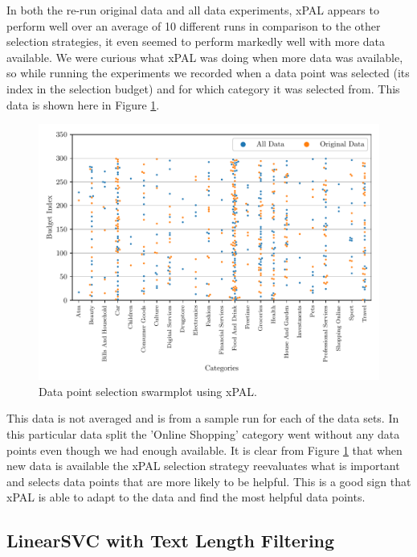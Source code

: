 In both the re-run original data and all data experiments, xPAL appears to perform well over an average of 10 different runs in comparison to the other selection strategies, it even seemed to perform markedly well with more data available. We were curious what xPAL was doing when more data was available, so while running the experiments we recorded when a data point was selected (its index in the selection budget) and for which category it was selected from. This data is shown here in Figure \ref{fig:xpal_data_selection}.

\begin{figure}[h]
  \centering
  \includegraphics[width=\textwidth]{../img/plot_xpal_selection_dist.pdf}
  \caption{Data point selection swarmplot using xPAL.}
  \label{fig:xpal_data_selection}
\end{figure}

This data is not averaged and is from a sample run for each of the data sets. In this particular data split the 'Online Shopping' category went without any data points even though we had enough available. It is clear from Figure \ref{fig:xpal_data_selection} that when new data is available the xPAL selection strategy reevaluates what is important and selects data points that are more likely to be helpful. This is a good sign that xPAL is able to adapt to the data and find the most helpful data points.

\subsection{LinearSVC with Text Length Filtering} 

